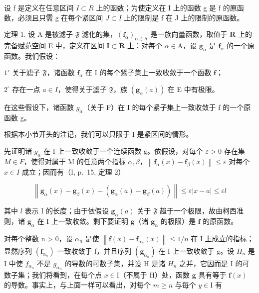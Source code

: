 设 f 是定义在任意区间 \(I \subset R\) 上的函数；为使定义在 I 上的函数 g 是 f 的原函数，必须且只需 g 在每个紧区间 \(J \subset I\) 上的限制是 f 在 J 上的限制的原函数。

定理 1. 设 A 是被滤子 \(\mathfrak{F}\) 滤化的集，\((\mathbf{f}_{\alpha})_{\alpha \in \mathrm{A}}\) 是一族向量函数，取值于 \(\mathbf{R}\) 上的完备赋范空间 E 中，定义在区间 \(\mathbf{I} \subset \mathbf{R}\) 上：对每个 \(\alpha \in \mathrm{A}\)，设 \(\mathbf{g}_{\alpha}\) 是 \(\mathbf{f}_{\alpha}\) 的一个原函数。我们假设：

\(1^{\circ}\) 关于滤子 \(\mathfrak{F}\)，诸函数 \(\mathbf{f}_{\alpha}\) 在 I 的每个紧子集上一致收敛于一个函数 \(\mathbf{f}\)；

\(2^{\circ}\) 存在一点 \(a \in I\)，使得关于滤子 \(\mathfrak{F}\)，族 \((\mathbf{g}_{\alpha}(a))\) 在 E 中有极限。

在这些假设下，诸函数 \(g_{\alpha}\)（关于 F）在 I 的每个紧子集上一致收敛于 f 的一个原函数 g。

根据本小节开头的注记，我们可以只限于 I 是紧区间的情形。

先证明诸 \(g_{\alpha}\) 在 I 上一致收敛于一个连续函数 g。依假设，对每个 \(\varepsilon > 0\) 存在集 \(M \in F\)，使得对属于 M 的任意两个指标 \(\alpha, \beta\)，\(\left\|\mathbf{f}_{\alpha}(x) - \mathbf{f}_{\beta}(x)\right\| \leqslant \varepsilon\) 对每个 \(x \in I\) 成立；因而有（I, p.~15, 定理 2）

\[
\left\| \mathbf {g} _ {\alpha} (x) - \mathbf {g} _ {\beta} (x) - (\mathbf {g} _ {\alpha} (a) - \mathbf {g} _ {\beta} (a)) \right\| \leqslant \varepsilon | x - a | \leqslant \varepsilon l
\]

其中 \(l\) 表示 I 的长度；由于依假设 \(\mathbf{g}_{\alpha}(a)\) 关于 \(\mathfrak{F}\) 趋于一个极限，故由柯西准则，诸 \(\mathbf{g}_{\alpha}\) 在 I 上一致收敛。剩下要证明 \(\mathbf{g}\)（诸 \(\mathbf{g}_{\alpha}\) 的极限）是 \(\mathbf{f}\) 的原函数。

对每个整数 n \textgreater{} 0，设 \(\alpha_{n}\) 是使 \(\left\|\mathbf{f}(x) - \mathbf{f}_{\alpha_{n}}(x)\right\| \leqslant 1/n\) 在 I 上成立的指标；显然序列 \(\left(\mathbf{f}_{\alpha_{n}}\right)\) 一致收敛于 f，并且序列 \(\left(\mathbf{g}_{\alpha_{n}}\right)\) 在 I 上一致收敛于 g。设 \(H_{n}\) 是 I 中使 \(f_{\alpha_{n}}\) 不是 \(g_{\alpha_{n}}\) 的导数的可数子集，并设 H 是诸 \(H_{n}\) 之并，它因而是 I 的可数子集；我们将看到，在每个点 \(x \in \mathrm{I}\)（不属于 \(\mathrm{H}\)）处，函数 \(\mathbf{g}\) 具有等于 \(\mathbf{f}(x)\) 的导数。事实上，与上面一样可以看出，对每个 \(m \geqslant n\) 与每个 \(y \in \mathrm{I}\) 有

